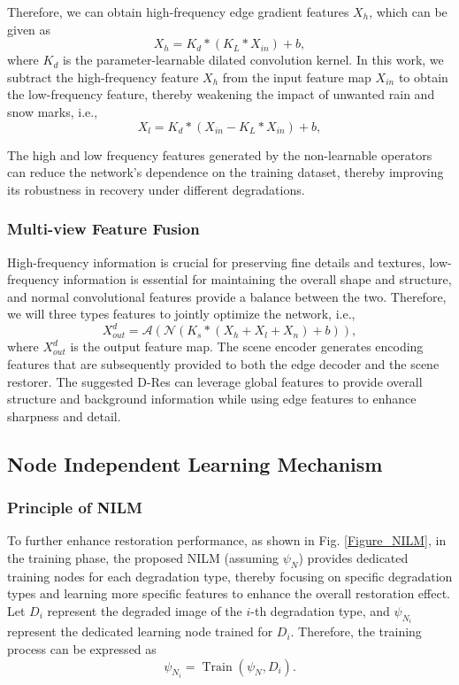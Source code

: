 \documentclass[final,12pt]{elsarticle}
\begin{document}
    Therefore, we can obtain high-frequency edge gradient features $X_{h}$, which can be given as
    \begin{equation}
        X_{h} = K_d * (K_L * X_{in}) + b,
    \end{equation}
   where $K_d$ is the parameter-learnable dilated convolution kernel. In this work, we subtract the high-frequency feature $X_{h}$ from the input feature map $X_{in}$ to obtain the low-frequency feature, thereby weakening the impact of unwanted rain and snow marks, i.e.,
    \begin{equation}
        X_{l} =  K_d * (X_{in} - K_L * X_{in}) + b,
    \end{equation}

    The high and low frequency features generated by the non-learnable operators can reduce the network's dependence on the training dataset, thereby improving its robustness in recovery under different degradations.
%
\subsubsection{Multi-view Feature Fusion}
%        
    High-frequency information is crucial for preserving fine details and textures, low-frequency information is essential for maintaining the overall shape and structure, and normal convolutional features provide a balance between the two. Therefore, we will three types features to jointly optimize the network, i.e.,
    \begin{equation}   
        X_{out}^d = \mathcal{A}(\mathcal{N}(K_s * (X_{h} + X_{l} + X_{n}) + b)),
    \end{equation}  
    where $X_{out}^d$ is the output feature map. The scene encoder generates encoding features that are subsequently provided to both the edge decoder and the scene restorer. The suggested D-Res can leverage global features to provide overall structure and background information while using edge features to enhance sharpness and detail.
%
\subsection{Node Independent Learning Mechanism}
%
\subsubsection{Principle of NILM}
%
    To further enhance restoration performance, as shown in Fig. \ref{Figure_NILM}, in the training phase, the proposed NILM (assuming $\psi_N$) provides dedicated training nodes for each degradation type, thereby focusing on specific degradation types and learning more specific features to enhance the overall restoration effect. Let $D_i$ represent the degraded image of the $i$-th degradation type, and $\psi_{N_i}$ represent the dedicated learning node trained for $D_i$. Therefore, the training process can be expressed as
    \begin{equation}
        \psi_{N_i}=\operatorname{Train}\left(\psi_N, D_i\right).
    \end{equation}
\end{document}
